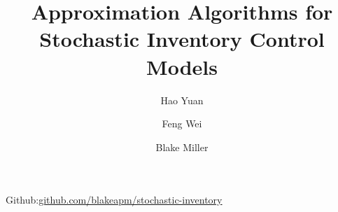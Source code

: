 \documentclass[twoside]{article}
\title{\vspace{-15mm}\fontsize{24pt}{10pt}\selectfont\textbf{Approximation Algorithms for Stochastic Inventory Control Models}}\vspace{-6ex} %
\author{Hao Yuan
\and
Feng Wei
\and
Blake Miller
}
\date{}
\begin{document}
\maketitle\vspace{-6ex} %
\thispagestyle{fancy} %




\begin{center}
{\ttfamily Github:\href{https://github.com/blakeapm/stochastic-inventory}{github.com/blakeapm/stochastic-inventory}}
\end{center}\vspace{-2ex}

\end{document}
